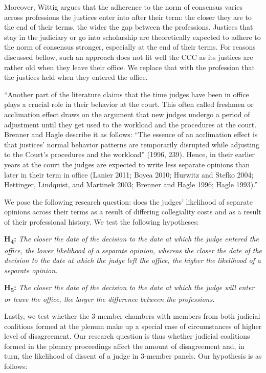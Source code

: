 \documentclass[
  11pt,
]{article}
\begin{document}
Moreover, Wittig argues that the adherence to the norm of consensus
varies across professions the justices enter into after their term: the
closer they are to the end of their terms, the wider the gap between the
professions. Justices that stay in the judiciary or go into scholarship
are theoretically expected to adhere to the norm of consensus stronger,
especially at the end of their terms. For reasons discussed bellow, such
an approach does not fit well the CCC as its justices are rather old
when they leave their office. We replace that with the profession that
the justices held when they entered the office.

``Another part of the literature claims that the time judges have been
in office plays a crucial role in their behavior at the court. This
often called freshmen or acclimation effect draws on the argument that
new judges undergo a period of adjustment until they get used to the
workload and the procedures at the court. Brenner and Hagle describe it
as follows: ``The essence of an acclimation effect is that justices'
normal behavior patterns are temporarily disrupted while adjusting to
the Court's procedures and the workload'' (1996, 239). Hence, in their
earlier years at the court the judges are expected to write less
separate opinions than later in their term in office (Lanier 2011; Boyea
2010; Hurwitz and Stefko 2004; Hettinger, Lindquist, and Martinek 2003;
Brenner and Hagle 1996; Hagle 1993).''

We pose the following research question: does the judges' likelihood of
separate opinions across their terms as a result of differing
collegiality costs and as a result of their professional history. We
test the following hypotheses:

\textbf{H\textsubscript{4}:} \emph{The closer the date of the decision
to the date at which the judge entered the office, the lower likelihood
of a separate opinion, whereas the closer the date of the decision to
the date at which the judge left the office, the higher the likelihood
of a separate opinion.}

\textbf{H\textsubscript{5}:} \emph{The closer the date of the decision
to the date at which the judge will enter or leave the office, the
larger the difference between the professions.}

Lastly, we test whether the 3-member chambers with members from both
judicial coalitions formed at the plenum make up a special case of
circumstances of higher level of disagreement. Our research question is
thus whether judicial coalitions formed in the plenary proceedings
affect the amount of disagreement and, in turn, the likelihood of
dissent of a judge in 3-member panels. Our hypothesis is as follows:
\end{document}
